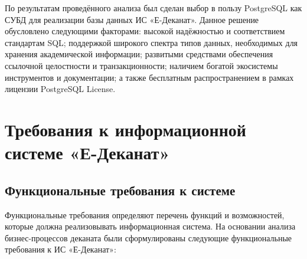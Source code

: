 \documentclass[14pt, a4paper]{extreport}
\begin{document}
По результатам проведённого анализа был сделан выбор в пользу PostgreSQL как СУБД для реализации базы данных ИС «Е-Деканат». Данное решение обусловлено следующими факторами: высокой надёжностью и соответствием стандартам SQL; поддержкой широкого спектра типов данных, необходимых для хранения академической информации; развитыми средствами обеспечения ссылочной целостности и транзакционности; наличием богатой экосистемы инструментов и документации; а также бесплатным распространением в рамках лицензии PostgreSQL License.

\section{Требования к информационной системе «Е-Деканат»}

\subsection{Функциональные требования к системе}
Функциональные требования определяют перечень функций и возможностей, которые должна реализовывать информационная система. На основании анализа бизнес-процессов деканата были сформулированы следующие функциональные требования к ИС «Е-Деканат»:
\end{document}

